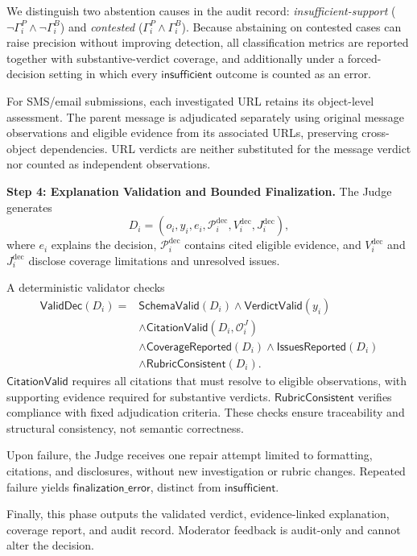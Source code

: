 We distinguish two abstention causes in the audit record:
\emph{insufficient-support} ($\neg\Gamma_i^P\land\neg\Gamma_i^B$) and
\emph{contested} ($\Gamma_i^P\land\Gamma_i^B$). Because abstaining on
contested cases can raise precision without improving detection, all
classification metrics are reported together with substantive-verdict
coverage, and additionally under a forced-decision setting in which every
$\mathsf{insufficient}$ outcome is counted as an error.

For SMS/email submissions, each
investigated URL retains its
object-level assessment. The parent
message is adjudicated separately
using original message observations
and eligible evidence from its
associated URLs, preserving
cross-object dependencies. URL
verdicts are neither substituted
for the message verdict nor counted
as independent observations.

\medskip
\noindent\textbf{Step 4: Explanation
Validation and Bounded Finalization.}
The Judge generates
\begin{equation}
D_i=
(o_i,y_i,e_i,
\mathcal P_i^{\mathrm{dec}},
V_i^{\mathrm{dec}},
J_i^{\mathrm{dec}}),
\label{eq:decision-record}
\end{equation}
where $e_i$ explains the decision,
$\mathcal P_i^{\mathrm{dec}}$
contains cited eligible evidence,
and $V_i^{\mathrm{dec}}$ and
$J_i^{\mathrm{dec}}$ disclose
coverage limitations and
unresolved issues.

A deterministic validator checks
\begin{equation}
\begin{aligned}
\mathsf{ValidDec}(D_i)={}&
\mathsf{SchemaValid}(D_i)
\land\mathsf{VerdictValid}(y_i)\\
&\land\mathsf{CitationValid}
(D_i,\mathcal O_i^J)\\
&\land\mathsf{CoverageReported}(D_i)
\land\mathsf{IssuesReported}(D_i)\\
&\land\mathsf{RubricConsistent}(D_i).
\end{aligned}
\label{eq:decision-validity}
\end{equation}
$\mathsf{CitationValid}$ requires
all citations that must resolve to eligible
observations, with supporting evidence
required for substantive verdicts.
$\mathsf{RubricConsistent}$ verifies
compliance with fixed adjudication criteria.
These checks ensure traceability and
structural consistency, not semantic
correctness.

Upon failure, the Judge receives one
repair attempt limited to formatting,
citations, and disclosures, without
new investigation or rubric changes.
Repeated failure yields
$\mathsf{finalization\_error}$,
distinct from $\mathsf{insufficient}$.

Finally, this phase outputs the validated verdict,
evidence-linked explanation, coverage
report, and audit record. Moderator
feedback is audit-only and cannot
alter the decision.
